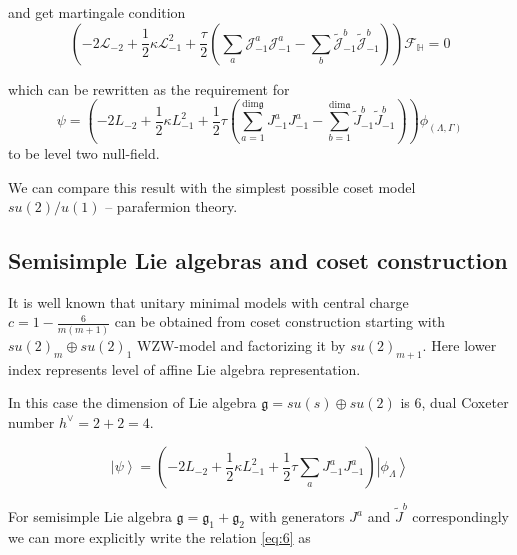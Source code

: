 \documentclass[a4paper]{jpconf}
\theoremstyle{definition}
\newcommand{\gf}{\mathfrak{g}}
\newcommand{\af}{\mathfrak{a}}
\theoremstyle{definition} \newtheorem{Def}{Definition}
\begin{document}

and get martingale condition
\begin{equation*}
  \left(-2 \mathcal{L}_{-2}+\frac{1}{2}\kappa \mathcal{L}_{-1}^{2}+\frac{\tau}{2}\left( \sum_{a} \mathcal{J}^{a}_{-1} \mathcal{J}^{a}_{-1}-
      \sum_{b}\tilde{\mathcal{J}}^{b}_{-1} \tilde{\mathcal{J}}^{b}_{-1}\right)\right)        \mathcal{F}_{\mathbb{H}}=0
\end{equation*}

which can be rewritten as the requirement for
\begin{equation*}
  \psi=\left(-2L_{-2}+\frac{1}{2}\kappa L_{-1}^{2}+\frac{1}{2}\tau \left(\sum_{a=1}^{\mathrm{dim}\gf}J^{a}_{-1}J^{a}_{-1}-\sum_{b=1}^{\mathrm{dim}\af}\tilde{J}^{b}_{-1}\tilde{J}^{b}_{-1}\right)\right) \phi_{(\Lambda,\Gamma)}
\end{equation*}
to be level two null-field.

We can compare this result with the simplest possible coset model $su(2)/u(1)$ --  parafermion theory.

\subsection{Semisimple Lie algebras and coset construction}
\label{sec:semis-lie-algebr}

It is well known that unitary minimal models with central charge $c=1-\frac{6}{m(m+1)}$ can be obtained from coset construction starting with $su(2)_{m}\oplus su(2)_{1}$ WZW-model and factorizing it by $su(2)_{m+1}$. Here lower index represents level of affine Lie algebra representation. 

In this case the dimension of Lie algebra $\gf=su(s)\oplus su(2)$ is 6, dual Coxeter number $h^{\vee}=2+2=4$. 


\begin{equation}
  \left| \psi\right>=\left(-2 L_{-2}+\frac{1}{2}\kappa L_{-1}^{2}+\frac{1}{2}\tau\sum_{a} J^{a}_{-1} J^{a}_{-1}\right) \left|\phi_{\Lambda}\right>    
\label{eq:6}
\end{equation}

For semisimple Lie algebra $\gf=\gf_{1}+\gf_{2}$ with generators $J^{a}$ and $\tilde{J}^{b}$ correspondingly we can more explicitly write the relation \eqref{eq:6} as 
\end{document}
